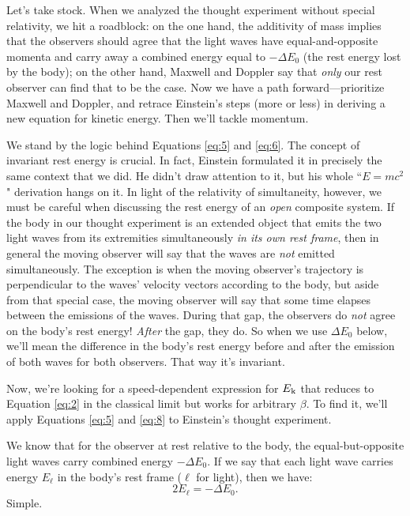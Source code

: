 \documentclass[12pt]{article}
\begin{document}
Let's take stock. When we analyzed the thought experiment without special relativity, we hit a roadblock: on the one hand, the additivity of mass implies that the observers should agree that the light waves have equal-and-opposite momenta and carry away a combined energy equal to $-\Delta E_0$ (the rest energy lost by the body); on the other hand, Maxwell and Doppler say that \emph{only} our rest observer can find that to be the case. Now we have a path forward---prioritize Maxwell and Doppler, and retrace Einstein's steps (more or less) in deriving a new equation for kinetic energy. Then we'll tackle momentum.

We stand by the logic behind Equations \ref{eq:5} and \ref{eq:6}. The concept of invariant rest energy is crucial. In fact, Einstein formulated it in precisely the same context that we did. He didn't draw attention to it, but his whole ``$E=mc^2$" derivation hangs on it. In light of the relativity of simultaneity, however, we must be careful when discussing the rest energy of an \emph{open} composite system. If the body in our thought experiment is an extended object that emits the two light waves from its extremities simultaneously \emph{in its own rest frame}, then in general the moving observer will say that the waves are \emph{not} emitted simultaneously. The exception is when the moving observer's trajectory is perpendicular to the waves' velocity vectors according to the body, but aside from that special case, the moving observer will say that some time elapses between the emissions of the waves. During that gap, the observers do \emph{not} agree on the body's rest energy! \emph{After} the gap, they do. So when we use $\Delta E_0$ below, we'll mean the difference in the body's rest energy before and after the emission of both waves for both observers. That way it's invariant.

Now, we're looking for a speed-dependent expression for $E_{\mkern.5mu \textrm{k}}$ that reduces to Equation \ref{eq:2} in the classical limit but works for arbitrary $\beta$. To find it, we'll apply Equations \ref{eq:5} and \ref{eq:8} to Einstein's thought experiment.

We know that for the observer at rest relative to the body, the equal-but-opposite light waves carry combined energy $-\Delta E_0$. If we say that each light wave carries energy $E_{\ell}$ in the body's rest frame ($\ell$ for light), then we have:
\begin{equation}\label{eq:9}
2E_{\ell}=-\Delta E_0.
\end{equation}
Simple.
\end{document}
